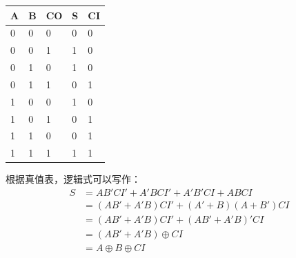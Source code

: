 \documentclass[UTF8]{ctexart}
\begin{document}
{\begin{table}[H]
    \begin{center}
    \begin{tabular}{p{4em}<{\centering}|p{4em}<{\centering}|p{4em}<{\centering}|p{4em}<{\centering}|p{4em}<{\centering}}
        \hline\hline
        A&B&CO&S&CI\\
        \hline
        0&0&0&0&0\\
        \hline
        0&0&1&1&0\\
        \hline
        0&1&0&1&0\\
        \hline
        0&1&1&0&1\\
        \hline
        1&0&0&1&0\\
        \hline
        1&0&1&0&1\\
        \hline
        1&1&0&0&1\\
        \hline
        1&1&1&1&1\\
        \hline
    \end{tabular}
\end{center}
\end{table}
根据真值表，逻辑式可以写作：
\begin{equation*}
\begin{aligned}
S &= AB'CI'+A'BCI'+A'B'CI+ABCI\\
&=(AB'+A'B)CI'+(A'+B)(A+B')CI\\
&=(AB'+A'B)CI'+(AB'+A'B)'CI\\
&=(AB'+A'B)\oplus CI\\
&=A\oplus B \oplus CI
\end{aligned}
\end{equation*}

}
\end{document}
